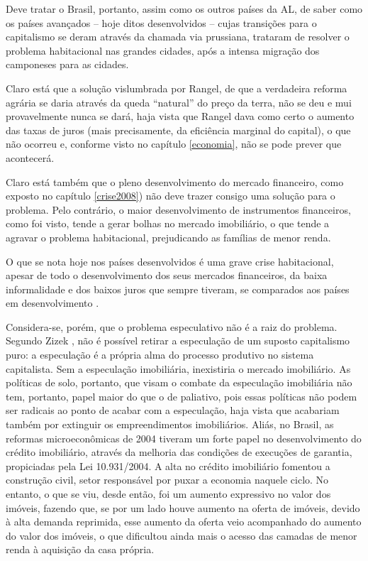 \documentclass[
	12pt,				%
	oneside,			%
	a4paper,			%
	chapter=TITLE,		%
	section=TITLE,		%
	english,			%
	brazil				%
	]{abntex2}
\begin{document}
\begin{refsection}
Deve tratar o Brasil, portanto, assim como os outros países da \gls{AL},
de saber como os países avançados -- hoje ditos desenvolvidos -- cujas
transições para o capitalismo se deram através da chamada via prussiana,
trataram de resolver o problema habitacional nas grandes cidades, após a intensa
migração dos camponeses para as cidades.

Claro está que a solução vislumbrada por Rangel, de que a verdadeira reforma
agrária se daria através da queda ``natural'' do preço da terra, não se deu e mui
provavelmente nunca se dará, haja vista que Rangel dava como certo o aumento das
taxas de juros (mais precisamente, da eficiência marginal do capital), o que não
ocorreu e, conforme visto no capítulo \ref{economia}, não se pode prever que
acontecerá.

Claro está também que o pleno desenvolvimento do mercado financeiro, como
exposto no capítulo \ref{crise2008}) não deve trazer consigo
uma solução para o problema. Pelo contrário, o maior desenvolvimento de
instrumentos financeiros, como foi visto, tende a gerar bolhas no mercado
imobiliário, o que tende a agravar o problema habitacional, prejudicando as
famílias de menor renda.

O que se nota hoje nos países desenvolvidos é uma grave crise habitacional,
apesar de todo o desenvolvimento dos seus mercados financeiros, da baixa
informalidade e dos baixos juros que sempre tiveram, se comparados aos países em
desenvolvimento \autocite{housing-europe,california}.

Considera-se, porém, que o problema especulativo não é a raiz do problema.
Segundo Zizek \autocite*[220-221]{zizek2005}, não é possível retirar a especulação de um
suposto capitalismo puro: a especulação é a própria alma do processo produtivo
no sistema capitalista. Sem a especulação imobiliária, inexistiria o mercado
imobiliário. As políticas de solo, portanto, que visam o combate da especulação
imobiliária não tem, portanto, papel maior do que o de paliativo, pois essas
políticas não podem ser radicais ao ponto de acabar com a especulação, haja
vista que acabariam também por extinguir os empreendimentos imobiliários. Aliás,
no Brasil, as reformas microeconômicas de 2004 tiveram um forte papel no
desenvolvimento do crédito imobiliário, através da melhoria das condições de
execuções de garantia, propiciadas pela Lei 10.931/2004. A alta no crédito
imobiliário fomentou a construção civil, setor responsável por puxar a economia
naquele ciclo. No entanto, o que se viu, desde então, foi um aumento expressivo
no valor dos imóveis, fazendo que, se por um lado houve aumento na oferta de
imóveis, devido à alta demanda reprimida, esse aumento da oferta veio
acompanhado do aumento do valor dos imóveis, o que dificultou ainda mais o
acesso das camadas de menor renda à aquisição da casa própria.


\end{refsection}
\end{document}
